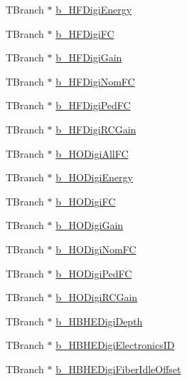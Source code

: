 \begin{DoxyCompactItemize}
\item 
T\+Branch $\ast$ \hyperlink{class_hcal_tuple_tree_ab5153b823d5f948228f674de33311f1b}{b\+\_\+\+H\+F\+Digi\+Energy}
\item 
T\+Branch $\ast$ \hyperlink{class_hcal_tuple_tree_a9fa6148288e48f333d64874b47f75d64}{b\+\_\+\+H\+F\+Digi\+F\+C}
\item 
T\+Branch $\ast$ \hyperlink{class_hcal_tuple_tree_ac98c3d4bd54cc3adbf260f3de541aae6}{b\+\_\+\+H\+F\+Digi\+Gain}
\item 
T\+Branch $\ast$ \hyperlink{class_hcal_tuple_tree_a069ece0b46c846c39a461e5fc69610f9}{b\+\_\+\+H\+F\+Digi\+Nom\+F\+C}
\item 
T\+Branch $\ast$ \hyperlink{class_hcal_tuple_tree_aec82a6cfa2eaec644874a4a6ad3802b4}{b\+\_\+\+H\+F\+Digi\+Ped\+F\+C}
\item 
T\+Branch $\ast$ \hyperlink{class_hcal_tuple_tree_aecaedbcae1b8d7c364f273c6d6223673}{b\+\_\+\+H\+F\+Digi\+R\+C\+Gain}
\item 
T\+Branch $\ast$ \hyperlink{class_hcal_tuple_tree_afd649f5fd77825cd7dd2de84a977130d}{b\+\_\+\+H\+O\+Digi\+All\+F\+C}
\item 
T\+Branch $\ast$ \hyperlink{class_hcal_tuple_tree_ad13314a7fc7995677522e58f39ab07d8}{b\+\_\+\+H\+O\+Digi\+Energy}
\item 
T\+Branch $\ast$ \hyperlink{class_hcal_tuple_tree_a0d217752a6b58690c8c3cf356579d9b4}{b\+\_\+\+H\+O\+Digi\+F\+C}
\item 
T\+Branch $\ast$ \hyperlink{class_hcal_tuple_tree_a5f38efe1a6af728b44f4aca3358931a3}{b\+\_\+\+H\+O\+Digi\+Gain}
\item 
T\+Branch $\ast$ \hyperlink{class_hcal_tuple_tree_a63b5ebcaf92cfbd86b742a3d51f8e9c7}{b\+\_\+\+H\+O\+Digi\+Nom\+F\+C}
\item 
T\+Branch $\ast$ \hyperlink{class_hcal_tuple_tree_a4f3b0c5bb93b68f4fdea80ec2b85ac40}{b\+\_\+\+H\+O\+Digi\+Ped\+F\+C}
\item 
T\+Branch $\ast$ \hyperlink{class_hcal_tuple_tree_a2a478dd45a47b02e3892d4ba21ffe8f1}{b\+\_\+\+H\+O\+Digi\+R\+C\+Gain}
\item 
T\+Branch $\ast$ \hyperlink{class_hcal_tuple_tree_ac420b6097c743146a82b051576e65664}{b\+\_\+\+H\+B\+H\+E\+Digi\+Depth}
\item 
T\+Branch $\ast$ \hyperlink{class_hcal_tuple_tree_a8af2a96cd531a4d20e67945b95752fa3}{b\+\_\+\+H\+B\+H\+E\+Digi\+Electronics\+I\+D}
\item 
T\+Branch $\ast$ \hyperlink{class_hcal_tuple_tree_a70a6887cdb94ac4b2cdf545a6583c6ff}{b\+\_\+\+H\+B\+H\+E\+Digi\+Fiber\+Idle\+Offset}

\end{DoxyCompactItemize}
